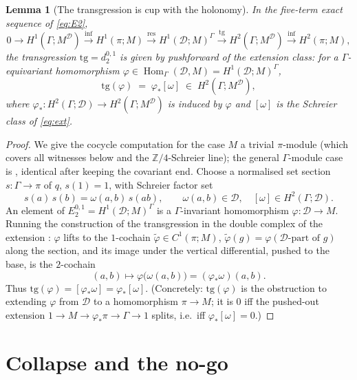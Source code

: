 \documentclass[11pt]{article}
\newtheorem{lemma}[theorem]{Lemma}
\theoremstyle{definition}
\newcommand{\Hom}{\operatorname{Hom}}
\newcommand{\D}{\mathcal{D}}
\newcommand{\Z}{\mathbb{Z}}
\newcommand{\infl}{\mathrm{inf}}
\newcommand{\res}{\mathrm{res}}
\newcommand{\tg}{\mathrm{tg}}
\begin{document}
\begin{lemma}[The transgression is cup with the holonomy]\label{lem:tg}
In the five-term exact sequence of \eqref{eq:E2},
\[
   0\to H^1(\Gamma;M^\D)\xrightarrow{\infl}H^1(\pi;M)\xrightarrow{\res}
   H^1(\D;M)^\Gamma\xrightarrow{\ \tg\ }H^2(\Gamma;M^\D)\xrightarrow{\infl}H^2(\pi;M),
\]
the transgression $\tg=d_2^{0,1}$ is given by pushforward of the extension class: for a
$\Gamma$-equivariant homomorphism $\varphi\in\Hom_\Gamma(\D,M)=H^1(\D;M)^\Gamma$,
\[
   \tg(\varphi)\;=\;\varphi_*[\omega]\;\in\;H^2(\Gamma;M^\D),
\]
where $\varphi_*\colon H^2(\Gamma;\D)\to H^2(\Gamma;M^\D)$ is induced by $\varphi$ and
$[\omega]$ is the Schreier class of \eqref{eq:ext}.
\end{lemma}
\begin{proof}
We give the cocycle computation for the case $M$ a trivial $\pi$-module (which covers all
witnesses below and the $\Z/4$-Schreier line); the general $\Gamma$-module case is
\cite[transgression formula]{nsw}, identical after keeping the covariant end. Choose a
normalised set section $s\colon\Gamma\to\pi$ of $q$, $s(1)=1$, with Schreier factor set
\[
   s(a)\,s(b)=\omega(a,b)\,s(ab),\qquad \omega(a,b)\in\D,\quad [\omega]\in H^2(\Gamma;\D).
\]
An element of $E_2^{0,1}=H^1(\D;M)^\Gamma$ is a $\Gamma$-invariant homomorphism
$\varphi\colon\D\to M$. Running the construction of the transgression in the double complex
of the extension \cite[\S6.8]{weibel}: $\varphi$ lifts to the $1$-cochain
$\tilde\varphi\in C^1(\pi;M)$, $\tilde\varphi(g)=\varphi(\text{$\D$-part of }g)$ along the
section, and its image under the vertical differential, pushed to the base, is the
$2$-cochain
\[
   (a,b)\longmapsto \varphi\bigl(\omega(a,b)\bigr)=(\varphi_*\omega)(a,b).
\]
Thus $\tg(\varphi)=[\varphi_*\omega]=\varphi_*[\omega]$. (Concretely: $\tg(\varphi)$ is the
obstruction to extending $\varphi$ from $\D$ to a homomorphism $\pi\to M$; it is $0$ iff the
pushed-out extension $1\to M\to\varphi_*\pi\to\Gamma\to1$ splits, i.e.\ iff
$\varphi_*[\omega]=0$.)
\end{proof}

\section{Collapse and the no-go}\label{sec:nogo}
\end{document}
